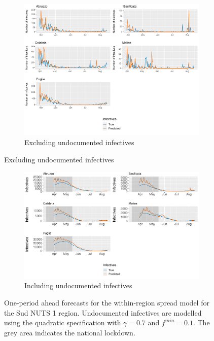 \documentclass[12pt]{article}
\begin{document}
\begin{appendices}
		\begin{figure}[H]
    	    \centering
    	    \begin{subfigure}{\textwidth}
    	      \centering
    	      \includegraphics[width=0.94\linewidth]{output/model_within_lag14_forecast_start20_Sud_rolling.pdf}
    	      \caption{Excluding undocumented infectives}
    	      \label{fig:forecast_within_sud_regular}
    	    \end{subfigure}
        \end{figure}
        \begin{figure}[H]\ContinuedFloat
    	    \begin{subfigure}{\textwidth}
    	      \centering
    	      \includegraphics[width=0.94\linewidth]{output/model_within_lag14_forecast_start20_Sud_UndocQuadratic_rolling.pdf}
    	      \caption{Including undocumented infectives}
    	      \label{fig:forecast_within_sud_undoc}
    	    \end{subfigure}
    	    \caption{One-period ahead forecasts for the within-region spread model for the Sud NUTS 1 region. Undocumented infectives are modelled using the quadratic specification with $\gamma = 0.7$ and $f^{min}=0.1$. The grey area indicates the national lockdown.}
    	    \label{fig:forecast_within_sud}
        \end{figure}
		

\end{appendices}
\end{document}
